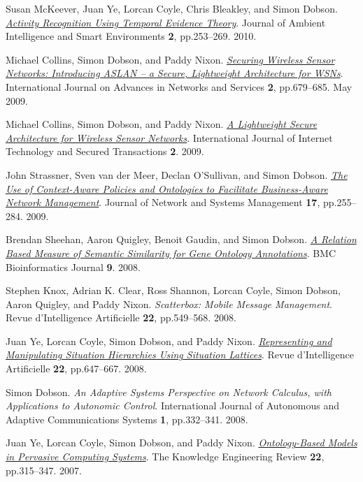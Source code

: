 \documentclass[11pt]{article}
\begin{document}
\label{orgff4d684}Susan McKeever, Juan Ye, Lorcan Coyle, Chris Bleakley, and Simon Dobson.  \emph{\href{https://dx.doi.org//10.3233/AIS-2010-0071}{Activity Recognition Using Temporal Evidence Theory}}. Journal of Ambient Intelligence and Smart Environments \textbf{2}, pp.253–269. 2010.

\label{orga964706}Michael Collins, Simon Dobson, and Paddy Nixon.  \emph{\href{https://simondobson.org/softcopy/aslan-09.pdf}{Securing Wireless Sensor Networks: Introducing ASLAN – a Secure, Lightweight Architecture for WSNs}}. International Journal on Advances in Networks and Services \textbf{2}, pp.679–685. May 2009.

\label{orgf84462e}Michael Collins, Simon Dobson, and Paddy Nixon.  \emph{\href{https://simondobson.org/softcopy/ijitst-08.pdf}{A Lightweight Secure Architecture for Wireless Sensor Networks}}. International Journal of Internet Technology and Secured Transactions \textbf{2}. 2009.

\label{org186a9c0}John Strassner, Sven van der Meer, Declan O’Sullivan, and Simon Dobson.  \emph{\href{https://dx.doi.org//10.1007/s10922-009-9126-4}{The Use of Context-Aware Policies and Ontologies to Facilitate Business-Aware Network Management}}. Journal of Network and Systems Management \textbf{17}, pp.255–284. 2009.

\label{org923630d}Brendan Sheehan, Aaron Quigley, Benoit Gaudin, and Simon Dobson.  \emph{\href{http://www.biomedcentral.com/1471-2105/9/468/abstract}{A Relation Based Measure of Semantic Similarity for Gene Ontology Annotations}}. BMC Bioinformatics Journal \textbf{9}. 2008.

\label{org4679703}Stephen Knox, Adrian K. Clear, Ross Shannon, Lorcan Coyle, Simon Dobson, Aaron Quigley, and Paddy Nixon.  \emph{Scatterbox: Mobile Message Management}. Revue d’Intelligence Artificielle \textbf{22}, pp.549–568. 2008.

\label{orgd87178f}Juan Ye, Lorcan Coyle, Simon Dobson, and Paddy Nixon.  \emph{\href{https://simondobson.org/softcopy/ria-08a.pdf}{Representing and Manipulating Situation Hierarchies Using Situation Lattices}}. Revue d’Intelligence Artificielle \textbf{22}, pp.647–667. 2008.

\label{org9b3ab23}Simon Dobson.  \emph{An Adaptive Systems Perspective on Network Calculus, with Applications to Autonomic Control}. International Journal of Autonomous and Adaptive Communications Systems \textbf{1}, pp.332–341. 2008.

\label{org4844822}Juan Ye, Lorcan Coyle, Simon Dobson, and Paddy Nixon.  \emph{\href{https://dx.doi.org//10.1017/S0269888907001208}{Ontology-Based Models in Pervasive Computing Systems}}. The Knowledge Engineering Review \textbf{22}, pp.315–347. 2007.
\end{document}
